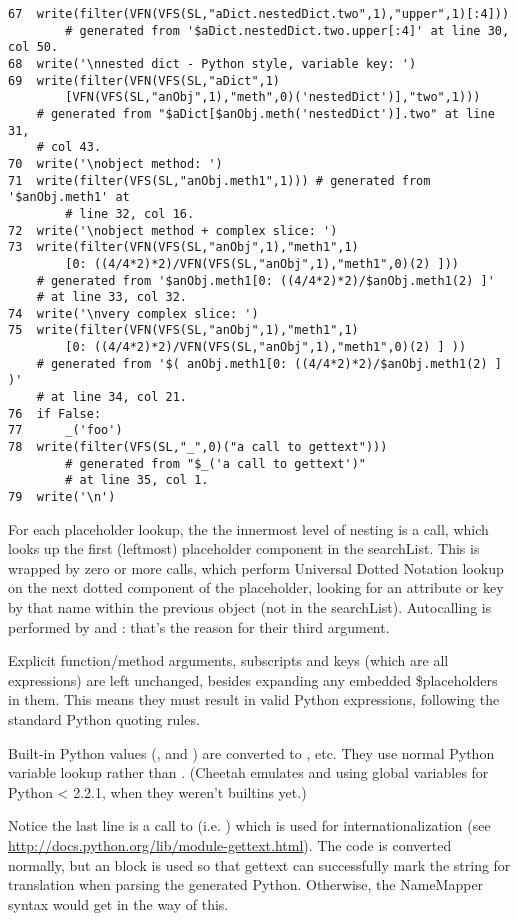 \begin{verbatim}
67  write(filter(VFN(VFS(SL,"aDict.nestedDict.two",1),"upper",1)[:4])) 
        # generated from '$aDict.nestedDict.two.upper[:4]' at line 30, col 50.
68  write('\nnested dict - Python style, variable key: ')
69  write(filter(VFN(VFS(SL,"aDict",1)
        [VFN(VFS(SL,"anObj",1),"meth",0)('nestedDict')],"two",1))) 
	# generated from "$aDict[$anObj.meth('nestedDict')].two" at line 31, 
	# col 43.
70  write('\nobject method: ')
71  write(filter(VFS(SL,"anObj.meth1",1))) # generated from '$anObj.meth1' at 
        # line 32, col 16.
72  write('\nobject method + complex slice: ')
73  write(filter(VFN(VFS(SL,"anObj",1),"meth1",1)
        [0: ((4/4*2)*2)/VFN(VFS(SL,"anObj",1),"meth1",0)(2) ])) 
	# generated from '$anObj.meth1[0: ((4/4*2)*2)/$anObj.meth1(2) ]' 
	# at line 33, col 32.
74  write('\nvery complex slice: ')
75  write(filter(VFN(VFS(SL,"anObj",1),"meth1",1)
        [0: ((4/4*2)*2)/VFN(VFS(SL,"anObj",1),"meth1",0)(2) ] )) 
	# generated from '$( anObj.meth1[0: ((4/4*2)*2)/$anObj.meth1(2) ] )' 
	# at line 34, col 21.
76  if False:
77      _('foo')
78  write(filter(VFS(SL,"_",0)("a call to gettext"))) 
        # generated from "$_('a call to gettext')" 
        # at line 35, col 1.
79  write('\n')
\end{verbatim}

For each placeholder lookup, the the innermost level of nesting is a 
call, which looks up the first (leftmost) placeholder component in the
searchList.  This is wrapped by zero or more  calls, which perform
Universal Dotted Notation lookup on the next dotted component of the
placeholder, looking for an attribute or key by that name within the previous
object (not in the searchList).  Autocalling is performed by  and
: that's the reason for their third argument.

Explicit function/method arguments, subscripts and keys (which
are all expressions) are left unchanged, besides expanding any embedded
\$placeholders in them.  This means they must result in valid Python
expressions, following the standard Python quoting rules.

Built-in Python values (,  and ) are
converted to , etc.  They use normal Python variable
lookup rather than .  (Cheetah emulates  and 
using global variables for Python < 2.2.1, when they weren't builtins yet.)

Notice the last line is a call to \code{_} (i.e. ) which is used
for internationalization (see
\url{http://docs.python.org/lib/module-gettext.html}).  The code is converted
normally, but an  block is used so that gettext can 
successfully mark the string for translation when parsing the generated Python.
Otherwise, the NameMapper syntax would get in the way of this.

